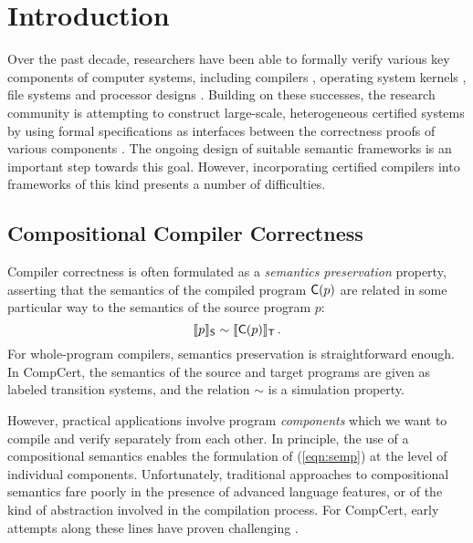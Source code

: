 \documentclass[sigplan,screen]{acmart}
\begin{document}


\maketitle

\section{Introduction} %


Over the past decade,
researchers have been able to formally verify
various key components of computer systems,
including
compilers \cite{compcert,cakeml,vellvm},
operating system kernels \cite{sel4,popl15,osdi16},
file systems \cite{fscq} and
processor designs \cite{safe,kami}.
Building on these successes,
the research community is attempting
to construct large-scale, heterogeneous certified systems
by using formal specifications as interfaces between
the correctness proofs of various components
\cite{deepspec}.
The ongoing design of suitable semantic frameworks
is an important step towards this goal.
However,
incorporating certified compilers
into frameworks of this kind
presents a number of difficulties.


\subsection{Compositional Compiler Correctness} %

Compiler correctness is often formulated as a
\emph{semantics preservation} property,
asserting that the semantics
of the compiled program $ \mathsf{C} (p)$
are related in some particular way
to the semantics
of the source program $p$:
\begin{equation} \label{eqn:semp}
  \llbracket p \rrbracket_{ \mathsf{S} } \sim
  \llbracket  \mathsf{C} (p) \rrbracket_{ \mathsf{T} }
  \,.
\end{equation}
For whole-program compilers,
semantics preservation is straightforward enough.
In CompCert,
the semantics of the source and target programs
are given as labeled transition systems,
and the relation $\sim$ is a simulation property.

However,
practical applications involve
program \emph{components} which we want to compile
and verify separately from each other.
In principle,
the use of a compositional semantics
enables the formulation of (\ref{eqn:semp})
at the level of individual components.
Unfortunately, traditional approaches to compositional semantics
fare poorly in the presence of advanced language features,
or of the kind of abstraction
involved in the compilation process.
For CompCert,
early attempts along these lines
have proven
challenging \cite{cpp15,compcompcert}.
\end{document}
